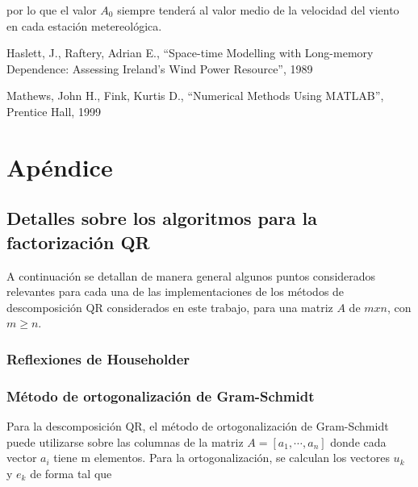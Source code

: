\documentclass[journal, monochrome]{IEEEtran}
\begin{document}
por lo que el valor $A_{0}$ siempre tenderá al valor medio de la velocidad del viento en cada estación metereológica.



\vspace{1cm}
\begin{thebibliography}{1}
	Haslett, J.,
	Raftery, Adrian E.,
	``Space-time Modelling with
   	Long-memory Dependence: Assessing Ireland's Wind Power Resource'',
	1989 

	Mathews, John H.,
	Fink, Kurtis D.,
	``Numerical Methods Using MATLAB'',
	Prentice Hall,
	1999
	
\end{thebibliography}



\clearpage
\section{Apéndice}
\vspace{0.5cm}
\subsection{Detalles sobre los algoritmos para la factorización QR}
\par
A continuación se detallan de manera general algunos puntos considerados relevantes para cada una de las implementaciones de los métodos de descomposición QR considerados en este trabajo, para una matriz $A$ de $mxn$, con $m \geq n$.
\newline
\subsubsection{Reflexiones de Householder}
\par
\subsubsection{Método de ortogonalización de Gram-Schmidt}
\par
Para la descomposición QR, el método de ortogonalización de Gram-Schmidt puede utilizarse sobre las columnas de la matriz $ A = [ a_1, \cdots , a_n ] $ donde cada vector $a_{i}$ tiene m elementos. Para la ortogonalización, se calculan los vectores $u_k$ y $e_k$ de forma tal que
\end{document}
